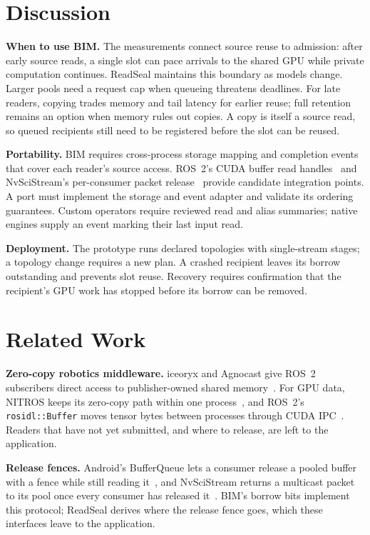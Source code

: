 \documentclass[conference]{IEEEtran}
\newcommand{\code}[1]{\texttt{#1}}
\begin{document}
\section{Discussion}
\label{sec:discussion}

\textbf{When to use BIM.} The measurements connect source reuse to admission: after early source reads, a single slot can pace arrivals to the shared GPU while private computation continues. ReadSeal maintains this boundary as models change. Larger pools need a request cap when queueing threatens deadlines. For late readers, copying trades memory and tail latency for earlier reuse; full retention remains an option when memory rules out copies. A copy is itself a source read, so queued recipients still need to be registered before the slot can be reused.

\textbf{Portability.} BIM requires cross-process storage mapping and completion events that cover each reader's source access. ROS~2's CUDA buffer read handles~\cite{cudabackend} and NvSciStream's per-consumer packet release~\cite{nvscistream} provide candidate integration points. A port must implement the storage and event adapter and validate its ordering guarantees. Custom operators require reviewed read and alias summaries; native engines supply an event marking their last input read.

\textbf{Deployment.} The prototype runs declared topologies with single-stream stages; a topology change requires a new plan. A crashed recipient leaves its borrow outstanding and prevents slot reuse. Recovery requires confirmation that the recipient's GPU work has stopped before its borrow can be removed.

\section{Related Work}
\label{sec:related}

\textbf{Zero-copy robotics middleware.} iceoryx and Agnocast give ROS~2 subscribers direct access to publisher-owned shared memory~\cite{iceoryx,agnocast}. For GPU data, NITROS keeps its zero-copy path within one process~\cite{nitros}, and ROS~2's \code{rosidl::Buffer} moves tensor bytes between processes through CUDA IPC~\cite{rosidlbuffer}. Readers that have not yet submitted, and where to release, are left to the application.

\textbf{Release fences.} Android's BufferQueue lets a consumer release a pooled buffer with a fence while still reading it~\cite{bufferqueue}, and NvSciStream returns a multicast packet to its pool once every consumer has released it~\cite{nvscistream}. BIM's borrow bits implement this protocol; ReadSeal derives where the release fence goes, which these interfaces leave to the application.
\end{document}

